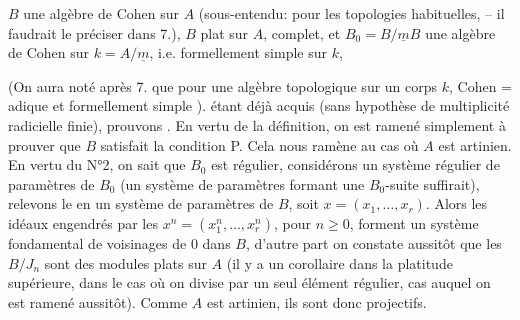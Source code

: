 
  $B$  une
algèbre de Cohen sur $A$ (sous-entendu: pour les topologies habituelles,
-- il faudrait le préciser dans 7.),  $B$
 plat sur $A$, complet, et  $B_0=B/\underline{m}B$
 une algèbre de Cohen sur $k=A/\underline{m}$, i.e.
formellement simple sur $k$,


(On aura noté  après 7. que pour une algèbre topologique sur un
corps $k$, Cohen = adique et formellement simple ). 
 étant
déjà acquis (sans hypothèse de multiplicité radicielle finie), prouvons
. En vertu de la définition, on est ramené simplement à
prouver que $B$ satisfait la condition P. Cela nous ramène au cas où $A$ est
artinien. En vertu du N°2, on sait que $B_0$ est régulier, considérons un
système régulier de paramètres de $B_0$ (un système de paramètres formant
une $B_0$-suite suffirait), relevons le en un système de paramètres de $B$,
soit $x=(x_1,\ldots,x_r)$. Alors les idéaux engendrés par les $x^n=(x_1^n,\ldots,x_r^n)$,
pour $n\geq0$, forment un système fondamental de voisinages de 0 dans
$B$, d'autre part on constate aussitôt que les $B/J_n$ sont des modules
plats sur $A$ (il y a un  corollaire dans la platitude supérieure,
dans le cas où on divise par un seul élément  régulier, cas
auquel on est ramené aussitôt). Comme $A$ est artinien, ils sont donc
projectifs. 



